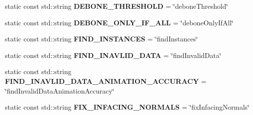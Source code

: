 \begin{DoxyCompactItemize}
\item 
\hypertarget{classrepo_1_1manipulator_1_1modelconvertor_1_1_model_import_config_a2a234d780f860e8a030c50379bede907}{}static const std\+::string {\bfseries D\+E\+B\+O\+N\+E\+\_\+\+T\+H\+R\+E\+S\+H\+O\+L\+D} = \char`\"{}debone\+Threshold\char`\"{}\label{classrepo_1_1manipulator_1_1modelconvertor_1_1_model_import_config_a2a234d780f860e8a030c50379bede907}

\item 
\hypertarget{classrepo_1_1manipulator_1_1modelconvertor_1_1_model_import_config_a940a4a19793113db0b79552529665f30}{}static const std\+::string {\bfseries D\+E\+B\+O\+N\+E\+\_\+\+O\+N\+L\+Y\+\_\+\+I\+F\+\_\+\+A\+L\+L} = \char`\"{}debone\+Only\+If\+All\char`\"{}\label{classrepo_1_1manipulator_1_1modelconvertor_1_1_model_import_config_a940a4a19793113db0b79552529665f30}

\item 
\hypertarget{classrepo_1_1manipulator_1_1modelconvertor_1_1_model_import_config_a5051583e215c14706bbdf2294c4460ba}{}static const std\+::string {\bfseries F\+I\+N\+D\+\_\+\+I\+N\+S\+T\+A\+N\+C\+E\+S} = \char`\"{}find\+Instances\char`\"{}\label{classrepo_1_1manipulator_1_1modelconvertor_1_1_model_import_config_a5051583e215c14706bbdf2294c4460ba}

\item 
\hypertarget{classrepo_1_1manipulator_1_1modelconvertor_1_1_model_import_config_aa009d5d58b94d3a8c4641fba11df436f}{}static const std\+::string {\bfseries F\+I\+N\+D\+\_\+\+I\+N\+A\+V\+L\+I\+D\+\_\+\+D\+A\+T\+A} = \char`\"{}find\+Invalid\+Data\char`\"{}\label{classrepo_1_1manipulator_1_1modelconvertor_1_1_model_import_config_aa009d5d58b94d3a8c4641fba11df436f}

\item 
\hypertarget{classrepo_1_1manipulator_1_1modelconvertor_1_1_model_import_config_a70498c5e3b6d7f1924111ac26a66f402}{}static const std\+::string {\bfseries F\+I\+N\+D\+\_\+\+I\+N\+A\+V\+L\+I\+D\+\_\+\+D\+A\+T\+A\+\_\+\+A\+N\+I\+M\+A\+T\+I\+O\+N\+\_\+\+A\+C\+C\+U\+R\+A\+C\+Y} = \char`\"{}find\+Invalid\+Data\+Animation\+Accuracy\char`\"{}\label{classrepo_1_1manipulator_1_1modelconvertor_1_1_model_import_config_a70498c5e3b6d7f1924111ac26a66f402}

\item 
\hypertarget{classrepo_1_1manipulator_1_1modelconvertor_1_1_model_import_config_a2e4328217c13cf74749bdaac08a75863}{}static const std\+::string {\bfseries F\+I\+X\+\_\+\+I\+N\+F\+A\+C\+I\+N\+G\+\_\+\+N\+O\+R\+M\+A\+L\+S} = \char`\"{}fix\+Infacing\+Normals\char`\"{}\label{classrepo_1_1manipulator_1_1modelconvertor_1_1_model_import_config_a2e4328217c13cf74749bdaac08a75863}


\end{DoxyCompactItemize}
